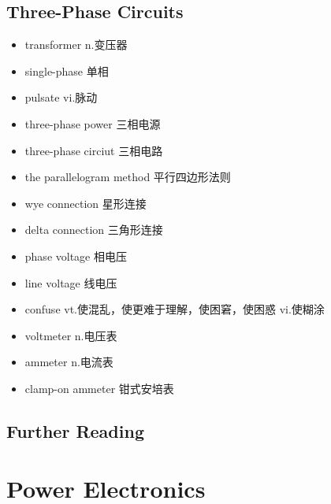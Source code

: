 \documentclass[11pt,a4paper,UTF8,titlepage]{ctexrep} %
\begin{document}
    \subsection{Three-Phase Circuits}
    \begin{multicols}{2}
        \begin{itemize}
            \item transformer n.变压器
            \item single-phase 单相
            \item pulsate vi.脉动
            \item three-phase power 三相电源
            \item three-phase circiut 三相电路
            \item the parallelogram method 平行四边形法则
            \item wye connection 星形连接
            \item delta connection 三角形连接
            \item phase voltage 相电压
            \item line voltage 线电压
            \item confuse vt.使混乱，使更难于理解，使困窘，使困惑 vi.使糊涂
            \item voltmeter n.电压表
            \item ammeter n.电流表
            \item clamp-on ammeter 钳式安培表
        \end{itemize}
    \end{multicols}

    \subsection{Further Reading}

    \section{Power Electronics}
\end{document}
